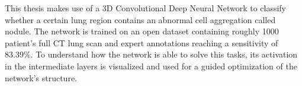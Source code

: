 \documentclass[main.tex]{subfiles}
\begin{document}
This thesis makes use of a 3D Convolutional Deep Neural Network to classify whether a certain lung region contains an abnormal cell aggregation called nodule. The network is trained on an open dataset containing roughly 1000 patient's full CT lung scan and expert annotations reaching a sensitivity of $83.39\%$. To understand how the network is able to solve this tasks, its activation in the intermediate layers is visualized and used for a guided optimization of the network's structure.
\end{document}
